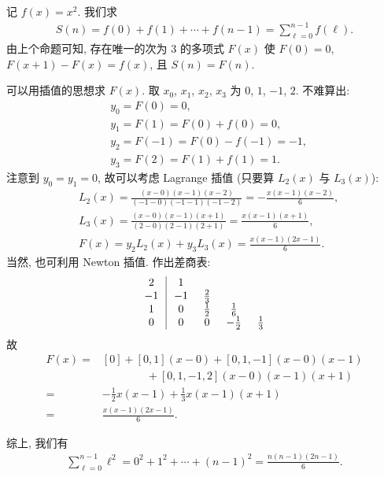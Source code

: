 \begin{example}
    记 $f(x) = x^2$. 我们求
    \begin{align*}
        S(n) = f(0) + f(1) + \cdots + f(n-1) = \sum_{\ell = 0}^{n - 1} f(\ell).
    \end{align*}
    由上个命题可知, 存在唯一的次为 $3$ 的多项式 $F(x)$ 使 $F(0) = 0$, $F(x + 1) - F(x) = f(x)$, 且 $S(n) = F(n)$.

    可以用插值的思想求 $F(x)$. 取 $x_0$, $x_1$, $x_2$, $x_3$ 为 $0$, $1$, $-1$, $2$. 不难算出:
    \begin{align*}
         & y_{0} = F(0) = 0,                  \\
         & y_{1} = F(1) = F(0) + f(0) = 0,    \\
         & y_{2} = F(-1) = F(0) - f(-1) = -1, \\
         & y_{3} = F(2) = F(1) + f(1) = 1.
    \end{align*}
    注意到 $y_0 = y_1 = 0$, 故可以考虑 Lagrange 插值 (只要算 $L_2 (x)$ 与 $L_3 (x)$):
    \begin{align*}
         & L_2 (x) = \frac{(x - 0)(x - 1)(x - 2)}{(-1 - 0)(-1 - 1)(-1 - 2)} = -\frac{x(x-1)(x-2)}{6}, \\
         & L_3 (x) = \frac{(x - 0)(x - 1)(x + 1)}{(2 - 0)(2 - 1)(2 + 1)} = \frac{x(x-1)(x+1)}{6},     \\
         & F(x) = y_2 L_2 (x) + y_3 L_3 (x) = \frac{x(x-1)(2x-1)}{6}.
    \end{align*}
    当然, 也可利用 Newton 插值. 作出差商表:
    \begin{align*}
        \arraycolsep=0.25cm
        \begin{array}{c|cccc}
            2  & 1  & \       & \        & \       \\
            -1 & -1 & \frac23 & \        & \       \\
            1  & 0  & \frac12 & \frac16  & \       \\
            0  & 0  & 0       & -\frac12 & \frac13 \\
        \end{array}
    \end{align*}
    故
    \begin{align*}
        F(x)
        = {} & [0] + [0,1] (x - 0) + [0,1,-1] (x - 0)(x - 1)    \\
             & \qquad \qquad + [0,1,-1,2] (x - 0)(x - 1)(x + 1) \\
        = {} & -\frac{1}{2} x(x-1) + \frac{1}{3} x(x-1)(x+1)    \\
        = {} & \frac{x(x-1)(2x-1)}{6}.
    \end{align*}

    综上, 我们有
    \begin{align*}
        \sum_{\ell = 0}^{n - 1} \ell^2 = 0^2 + 1^2 + \cdots + (n-1)^2 = \frac{n(n-1)(2n-1)}{6}.
    \end{align*}
\end{example}

